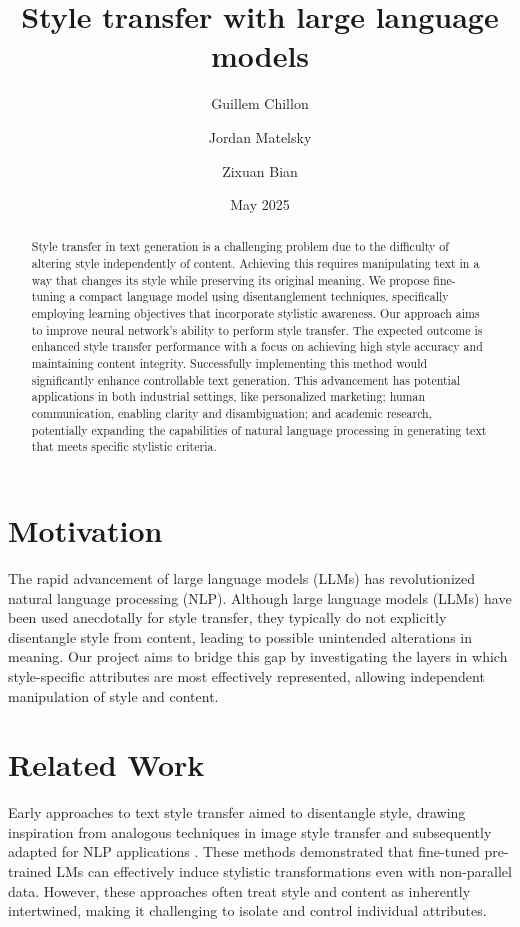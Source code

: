 \documentclass[twocolumn]{article}
\title{Style transfer with large language models}
\author[1]{Guillem Chillon}
\author[2]{Jordan Matelsky}
\author[3]{Zixuan Bian}
\affil[1]{guillemc@seas.upenn.edu}
\affil[2]{matelsky@upenn.edu}
\affil[3]{bianzx@seas.upenn.edu}
\date{May 2025}
\begin{document}
\maketitle

\begin{abstract}
Style transfer in text generation is a challenging problem due to the difficulty of altering style independently of content.
Achieving this requires manipulating text in a way that changes its style while preserving its original meaning.
We propose fine-tuning a compact language model using disentanglement techniques, specifically employing learning objectives that incorporate stylistic awareness.
Our approach aims to improve neural network's ability to perform style transfer. The expected outcome is enhanced style transfer performance with a focus on achieving high style accuracy and maintaining content integrity.
Successfully implementing this method would significantly enhance controllable text generation.
This advancement has potential applications in both industrial settings, like personalized marketing; human communication, enabling clarity and disambiguation; and academic research, potentially expanding the capabilities of natural language processing in generating text that meets specific stylistic criteria.

\end{abstract}

\section{Motivation}

The rapid advancement of large language models (LLMs) has revolutionized natural language processing (NLP). Although large language models (LLMs) have been used anecdotally for style transfer, they typically do not explicitly disentangle style from content, leading to possible unintended alterations in meaning. Our project aims to bridge this gap by investigating the layers in which style-specific attributes are most effectively represented, allowing independent manipulation of style and content.

\section{Related Work}
Early approaches to text style transfer aimed to disentangle style, drawing inspiration from analogous techniques in image style transfer \citep{gatys2016image, zhu2017unpaired} and subsequently adapted for NLP applications \citep{john2019disentangled, patel2022low}. These methods demonstrated that fine-tuned pre-trained LMs can effectively induce stylistic transformations even with non-parallel data. However, these approaches often treat style and content as inherently intertwined, making it challenging to isolate and control individual attributes.
\end{document}
